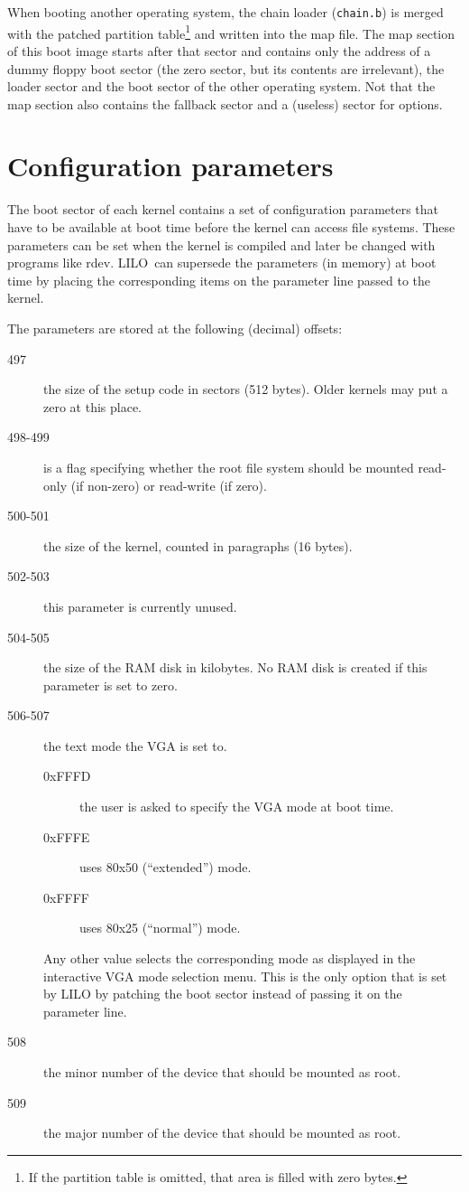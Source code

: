 \documentclass[fullpage]{article}
\def\LILO{LILO}
\begin{document}
$$
  
$$

When booting another operating system, the chain loader ({\tt chain.b}) is
merged with the patched partition table\footnote{If the partition table is
omitted, that area is filled with zero bytes.} and written into the map file.
The map section of this boot image starts after that sector and contains only
the address of a dummy floppy boot sector (the zero sector, but its
contents are irrelevant), the loader
sector and the boot sector of the other operating system. Not that the
map section also contains the fallback sector and a (useless) sector for
options.


\section{Configuration parameters}

The boot sector of each kernel contains a set of configuration parameters
that have to be available at boot time before the kernel can access
file systems. These parameters can be set when the kernel is compiled and
later be changed with programs like {\sf rdev}. \LILO\ can supersede
the parameters (in memory) at boot time by placing the corresponding
items on the parameter line passed to the kernel.

The parameters are stored at the following (decimal) offsets:

\begin{description}
  \item[497] the size of the setup code in sectors (512 bytes). Older kernels
    may put a zero at this place.
  \item[498-499] is a flag specifying whether the root file system should be
    mounted read-only (if non-zero) or read-write (if zero).
  \item[500-501] the size of the kernel, counted in paragraphs (16 bytes).
  \item[502-503] this parameter is currently unused.
  \item[504-505] the size of the RAM disk in kilobytes. No RAM disk is
    created if this parameter is set to zero.
  \item[506-507] the text mode the VGA is set to.
    \begin{description}
      \item[0xFFFD] the user is asked to specify the VGA mode at boot time.
      \item[0xFFFE] uses 80x50 (``extended'') mode.
      \item[0xFFFF] uses 80x25 (``normal'') mode.
    \end{description}
    Any other value selects the corresponding mode as displayed in the
    interactive VGA mode selection menu. This is the only option that is set
    by LILO by patching the boot sector instead of passing it on the parameter
    line.
  \item[508] the minor number of the device that should be mounted as root.
  \item[509] the major number of the device that should be mounted as root.
\end{description}
\end{document}
